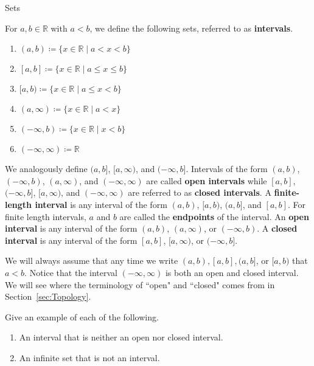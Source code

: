 \begin{section}{Sets}
\begin{definition}
For $a,b\in\mathbb{R}$ with $a<b$, we define the following sets, referred to as \textbf{intervals}.
\begin{enumerate}[label=\textrm{(\alph*)}]
\item $\boxed{(a,b)\coloneqq \{x\in\mathbb{R}\mid a<x<b\}}$
\item $\boxed{[a,b]\coloneqq \{x\in\mathbb{R}\mid a\leq x\leq b\}}$
\item $\boxed{[a,b)\coloneqq \{x\in\mathbb{R}\mid a\leq x< b\}}$
\item $\boxed{(a,\infty)\coloneqq \{x\in\mathbb{R}\mid a<x\}}$
\item $\boxed{(-\infty,b)\coloneqq \{x\in\mathbb{R}\mid x<b\}}$
\item $\boxed{(-\infty,\infty)\coloneqq \mathbb{R}}$
\end{enumerate}
We analogously define $(a,b]$, $[a,\infty)$, and $(-\infty,b]$. Intervals of the form $(a,b)$, $(-\infty,b)$, $(a,\infty)$, and $(-\infty,\infty)$ are called \textbf{open intervals} while $[a,b]$, $(-\infty,b]$, $[a,\infty)$, and $(-\infty,\infty)$ are referred to as \textbf{closed intervals}. A \textbf{finite-length interval} is any interval of the form $(a,b)$, $[a,b)$, $(a,b]$, and $[a,b]$. For finite length intervals, $a$ and $b$ are called the \textbf{endpoints} of the interval. An \textbf{open interval} is any interval of the form $(a,b)$, $(a,\infty)$, or $(-\infty,b)$. A \textbf{closed interval} is any interval of the form $[a,b]$, $[a,\infty)$, or $(-\infty,b]$.
\end{definition}

We will always assume that any time we write $(a,b), [a,b], (a,b]$, or $[a,b)$ that $a<b$. Notice that the interval $(-\infty,\infty)$ is both an open and closed interval.
We will see where the terminology of ``open" and ``closed" comes from in Section~\ref{sec:Topology}. 

\begin{problem}
Give an example of each of the following.
\begin{enumerate}[label=\textrm{(\alph*)}]
\item An interval that is neither an open nor closed interval.
\item An infinite set that is not an interval.
\end{enumerate}
\end{problem}


\end{section}

